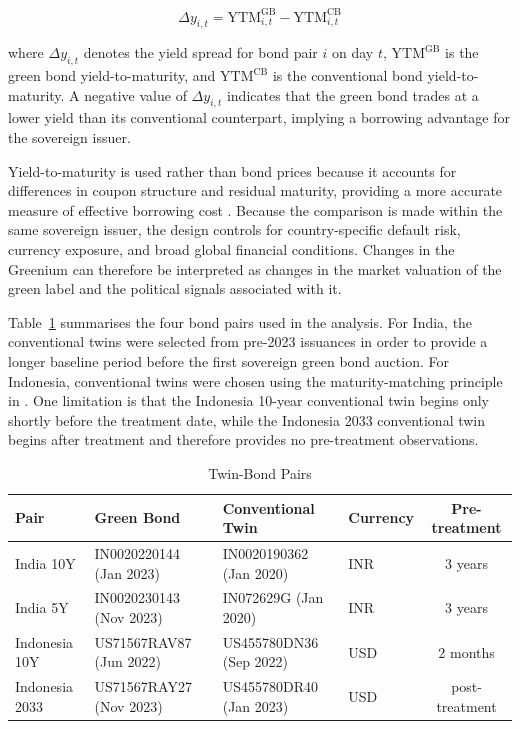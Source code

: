 \documentclass[12pt,a4paper]{article}
\begin{document}
\begin{equation}
\Delta y_{i,t} = \text{YTM}^{\text{GB}}_{i,t} - \text{YTM}^{\text{CB}}_{i,t}
\label{eq:greenium_def}
\end{equation}

\noindent where $\Delta y_{i,t}$ denotes the yield spread for bond pair $i$ on day $t$, $\text{YTM}^{\text{GB}}$ is the green bond yield-to-maturity, and $\text{YTM}^{\text{CB}}$ is the conventional bond yield-to-maturity. A negative value of $\Delta y_{i,t}$ indicates that the green bond trades at a lower yield than its conventional counterpart, implying a borrowing advantage for the sovereign issuer.

Yield-to-maturity is used rather than bond prices because it accounts for differences in coupon structure and residual maturity, providing a more accurate measure of effective borrowing cost \citep{Zerbib2019}. Because the comparison is made within the same sovereign issuer, the design controls for country-specific default risk, currency exposure, and broad global financial conditions. Changes in the Greenium can therefore be interpreted as changes in the market valuation of the green label and the political signals associated with it.

Table~\ref{tab:twin_bonds} summarises the four bond pairs used in the analysis. For India, the conventional twins were selected from pre-2023 issuances in order to provide a longer baseline period before the first sovereign green bond auction. For Indonesia, conventional twins were chosen using the maturity-matching principle in \citet{Zerbib2019}. One limitation is that the Indonesia 10-year conventional twin begins only shortly before the treatment date, while the Indonesia 2033 conventional twin begins after treatment and therefore provides no pre-treatment observations.

\begin{table}[H]
\centering
\caption{Twin-Bond Pairs}
\label{tab:twin_bonds}
\small
\begin{tabular}{llllc}
\toprule
\textbf{Pair} & \textbf{Green Bond} & \textbf{Conventional Twin} & \textbf{Currency} & \textbf{Pre-treatment} \\
\midrule
India 10Y      & IN0020220144 (Jan 2023) & IN0020190362 (Jan 2020) & INR & 3 years \\
India 5Y       & IN0020230143 (Nov 2023) & IN072629G (Jan 2020)    & INR & 3 years \\
Indonesia 10Y  & US71567RAV87 (Jun 2022) & US455780DN36 (Sep 2022) & USD & 2 months \\
Indonesia 2033 & US71567RAY27 (Nov 2023) & US455780DR40 (Jan 2023) & USD & post-treatment \\
\bottomrule
\end{tabular}
\end{table}
\end{document}
